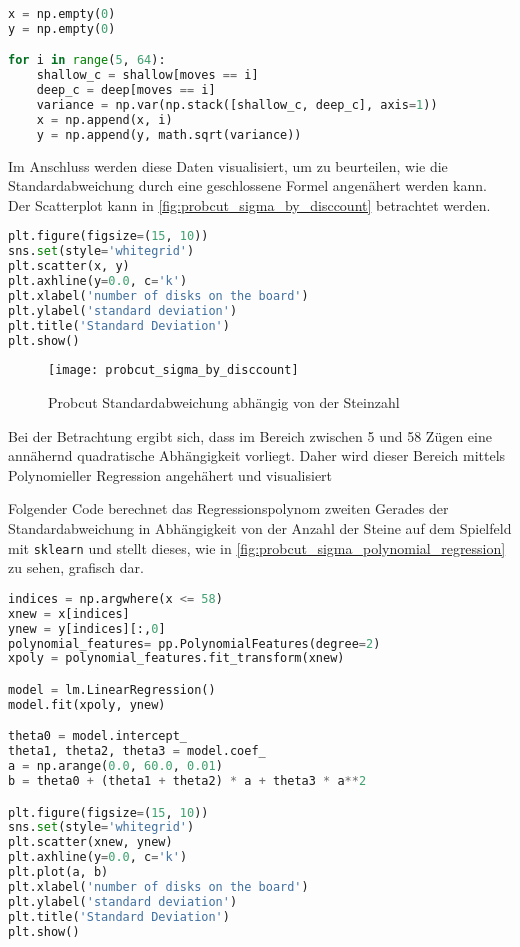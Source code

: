\begin{lstlisting}[language=Python]
x = np.empty(0)
y = np.empty(0)

for i in range(5, 64):
    shallow_c = shallow[moves == i]
    deep_c = deep[moves == i]
    variance = np.var(np.stack([shallow_c, deep_c], axis=1))
    x = np.append(x, i)
    y = np.append(y, math.sqrt(variance))
\end{lstlisting}

Im Anschluss werden diese Daten visualisiert, um zu beurteilen, wie die
Standardabweichung durch eine geschlossene Formel angenähert werden
kann. Der Scatterplot kann in \autoref{fig:probcut_sigma_by_disccount}
betrachtet werden.

\begin{lstlisting}[language=Python]
plt.figure(figsize=(15, 10))
sns.set(style='whitegrid')
plt.scatter(x, y)
plt.axhline(y=0.0, c='k')
plt.xlabel('number of disks on the board')
plt.ylabel('standard deviation')
plt.title('Standard Deviation')
plt.show()
\end{lstlisting}

\begin{figure}[h]
    \centering
    \texttt{[image: probcut\_sigma\_by\_disccount]}
    \caption{Probcut Standardabweichung abhängig von der Steinzahl}
    \label{fig:probcut_sigma_by_disccount}
\end{figure}

Bei der Betrachtung ergibt sich, dass im Bereich zwischen 5 und 58 Zügen
eine annähernd quadratische Abhängigkeit vorliegt. Daher wird dieser
Bereich mittels Polynomieller Regression angehähert und visualisiert

Folgender Code berechnet das Regressionspolynom zweiten Gerades der
Standardabweichung in Abhängigkeit von der Anzahl der Steine auf dem
Spielfeld mit \passthrough{\lstinline!sklearn!} und stellt dieses, wie
in \autoref{fig:probcut_sigma_polynomial_regression} zu sehen, grafisch
dar.

\begin{lstlisting}[language=Python]
indices = np.argwhere(x <= 58)
xnew = x[indices]
ynew = y[indices][:,0]
polynomial_features= pp.PolynomialFeatures(degree=2)
xpoly = polynomial_features.fit_transform(xnew)

model = lm.LinearRegression()
model.fit(xpoly, ynew)

theta0 = model.intercept_
theta1, theta2, theta3 = model.coef_
a = np.arange(0.0, 60.0, 0.01)
b = theta0 + (theta1 + theta2) * a + theta3 * a**2

plt.figure(figsize=(15, 10))
sns.set(style='whitegrid')
plt.scatter(xnew, ynew)
plt.axhline(y=0.0, c='k')
plt.plot(a, b)
plt.xlabel('number of disks on the board')
plt.ylabel('standard deviation')
plt.title('Standard Deviation')
plt.show()
\end{lstlisting}


